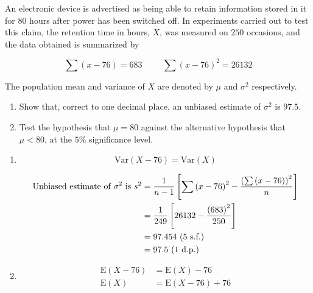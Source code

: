 \documentclass[11pt,a4paper]{book}
\begin{document}
\newpage

\begin{example}

An electronic device is advertised as being able to retain information
stored in it for $80$ hours after power has been switched off. In
experiments carried out to test this claim, the retention time in
hours, $X$, was measured on $250$ occasions, and the data obtained
is summarized by 

\[
\sum\left(x-76\right)=683\hspace{1cm}\sum\left(x-76\right)^{2}=26132
\]

The population mean and variance of $X$ are denoted by $\mu$ and
$\sigma^{2}$ respectively.

\begin{enumerate}[label=(\alph*)] 

\item  Show that, correct to one decimal place, an unbiased estimate
of $\sigma^{2}$ is $97.5$.

\item  Test the hypothesis that $\mu=80$ against the alternative
hypothesis that $\mu<80$, at the $5\%$ significance level.

\end{enumerate}

\Solution

\begin{enumerate}[label=(\alph*)] 

\item 

\[
\text{Var}\left(X-76\right)=\text{Var}\left(X\right)
\]

\begin{align*}
\text{Unbiased estimate of \ensuremath{\sigma^{2}} is }s^{2} & =\frac{1}{n-1}\left[\sum\left(x-76\right)^{2}-\frac{\left(\sum\left(x-76\right)\right)^{2}}{n}\right]\\
 & =\frac{1}{249}\left[26132-\frac{\left(683\right)^{2}}{250}\right]\\
 & =97.454\text{ (5 s.f.)}\\
 & =97.5\text{ (1 d.p.)}
\end{align*}

\item  

\begin{align*}
\text{E}\left(X-76\right) & =\text{E}\left(X\right)-76\\
\text{E}\left(X\right) & =\text{E}\left(X-76\right)+76
\end{align*}


\end{enumerate}
\end{example}
\end{document}

